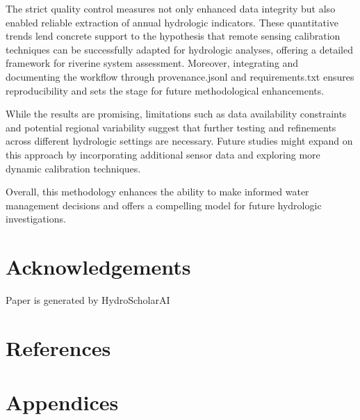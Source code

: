 \documentclass[preprint,12pt]{elsarticle}
\begin{document}
The strict quality control measures not only enhanced data integrity but also enabled reliable extraction of annual hydrologic indicators. These quantitative trends lend concrete support to the hypothesis that remote sensing calibration techniques can be successfully adapted for hydrologic analyses, offering a detailed framework for riverine system assessment. Moreover, integrating and documenting the workflow through provenance.jsonl and requirements.txt ensures reproducibility and sets the stage for future methodological enhancements.

While the results are promising, limitations such as data availability constraints and potential regional variability suggest that further testing and refinements across different hydrologic settings are necessary. Future studies might expand on this approach by incorporating additional sensor data and exploring more dynamic calibration techniques.

Overall, this methodology enhances the ability to make informed water management decisions and offers a compelling model for future hydrologic investigations.


\section*{Acknowledgements}

Paper is generated by HydroScholarAI


\section*{References}



\section*{Appendices}



\end{document}
